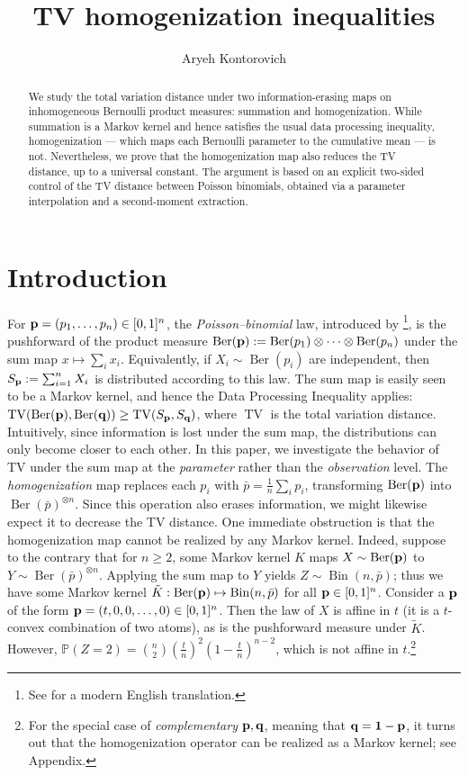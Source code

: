 \documentclass[11pt]{amsart}
\title[TV homogenization inequalities]{TV homogenization inequalities}
\author[A.~Kontorovich]{Aryeh Kontorovich}
\date{} %
\theoremstyle{plain}
\theoremstyle{definition}
\DeclareMathOperator{\TV}{TV}
\DeclareMathOperator{\Bin}{Bin}
\DeclareMathOperator{\Ber}{Ber}
\renewcommand{\P}{\mathbb{P}}
\newcommand{\paren}[1]{\left( #1 \right)}
\newcommand{\mybin}[2]{\Bin(#1,#2)}
\renewcommand{\vec}[1]{\textup{{\bf #1}}}
\begin{document}
\begin{abstract}
We study the total variation distance under two information-erasing maps on inhomogeneous Bernoulli product measures: summation and homogenization. While summation is a Markov kernel and hence satisfies the usual data processing inequality, homogenization --- which maps each Bernoulli parameter to the cumulative mean --- is not. Nevertheless, we prove that the homogenization map also reduces the TV distance, up to a universal constant. The argument is based on an explicit two-sided control of the TV distance between Poisson binomials, obtained via a parameter interpolation and a second-moment extraction.
\end{abstract}

\maketitle

\section{Introduction}

For $\vec{p}=(p_1,\dots,p_n)\in[0,1]^n$,
the
\emph{Poisson--binomial}
law, introduced by
\cite{Poisson1837}\footnote{
See \cite{PoissonSheynin2019} for a modern English translation.
},
is
the pushforward of the product measure
$
\Ber(\vec{p})
:=
\Ber(p_1)\otimes\cdots\otimes\Ber(p_n)$ under the sum map
$x\mapsto\sum_i x_i$.
Equivalently, if
$X_i\sim\Ber(p_i)$ are independent,
then
$S_{\vec{p}}:=\sum_{i=1}^n X_i$
is distributed according to this law.
The sum map is easily seen to be a Markov kernel,
and hence the Data Processing Inequality
\cite[Theorem 7.4]{Polyanskiy_Wu_2024}
applies:
$
\TV(\Ber(\vec{p}),\Ber(\vec{q}))
\ge
\TV(S_{\vec{p}},S_{\vec{q}})
$, where $\TV$ is the total variation distance.
Intuitively, since information is lost under the sum map,
the distributions can only become closer to each other.
In this paper, we investigate
the behavior of TV under
the sum map at the {\em parameter} rather than the {\em observation} level.
The {\em homogenization} map replaces each $p_i$
with
$\bar p=\frac1n\sum_i p_i$,
transforming $\Ber(\vec{p})$
into
$
\Ber(\bar p)^{\otimes n}
$.
Since this operation also erases information,
we might likewise expect it to decrease the TV distance.
One immediate obstruction is that
the homogenization map
cannot be realized by any Markov kernel.
Indeed,
suppose to the contrary that
for $n\ge2$,
some Markov kernel $K$
maps $X\sim \Ber(\vec{p})$ to
$
Y\sim
\Ber(\bar p)^{\otimes n}
$.
Applying the sum map to $Y$
yields
$Z\sim
\mybin{n}{\bar p}
$;
thus we have some Markov kernel $\tilde K:
\Ber(\vec{p})
\mapsto
\mybin{n}{\bar p}
$
for all $\vec{p}\in[0,1]^n$.
Consider a $\vec{p}$ of the form $\vec{p}=(t,0,0,\ldots,0)\in[0,1]^n$.
Then the law of $X$ is affine in $t$ (it is a $t$-convex combination of two atoms), as is the pushforward measure
under $\tilde K$.
However, $
\P(Z=2)=\binom{n}{2}\paren{\frac{t}{n}}^2\paren{1-\frac{t}{n}}^{n-2}
$, which is not affine in $t$.\footnote{
For the special case of {\em complementary} $\vec p,\vec q$,
meaning that $\vec q=\vec 1-\vec p$, it turns out that the homogenization operator can be realized as a Markov kernel;
see Appendix.
}
\end{document}
